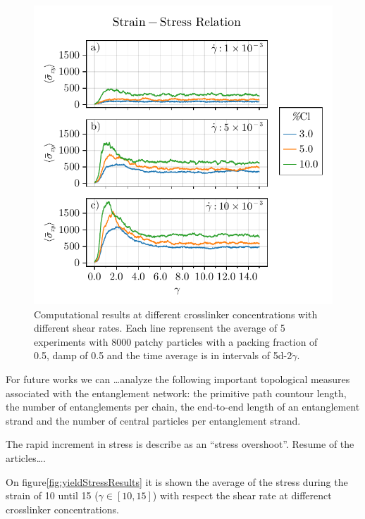 \begin{figure}[ht!]
    \centering
    \includegraphics[width=\textwidth]{figs/ComputaitonalResults/zoom-clResponse.pdf}
    \caption{Computational results at different crosslinker concentrations with different shear rates. Each line reprensent the average of 5 experiments with \num{8000} patchy particles with a packing fraction of \num{0.5}, damp of \num{0.5} and the time average is in intervals of \num{5d-2}$\dot{\gamma}$.}\label{fig:stress-strainCLResults}
\end{figure}



For future works we can \dots analyze the following important topological measures associated with the entanglement network: the primitive path countour length, the number of entanglements per chain, the end-to-end length of an entanglement strand and the number of central particles per entanglement strand.




The rapid increment in stress is describe as an ``stress overshoot''.
Resume of the articles\ldots.

On figure\ref{fig:yieldStressResults} it is shown the average of the stress during the strain of \num{10} until \num{15} ($\gamma\in[10,15]$) with respect the shear rate at differenct crosslinker concentrations.

